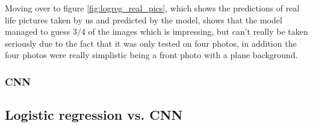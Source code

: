 \documentclass[../main.tex]{subfiles}
\begin{document}
Moving over to figure \ref{fig:logreg_real_pics}, which shows the predictions of real life pictures taken by us and predicted by the model, shows that the model managed to guess 3/4 of the images which is impressing, but can't really be taken seriously due to the fact that it was only tested on four photos, in addition the four photos were really simplistic being a front photo with a plane background.


\subsubsection{CNN}
\subsection{Logistic regression vs. CNN}
\end{document}
